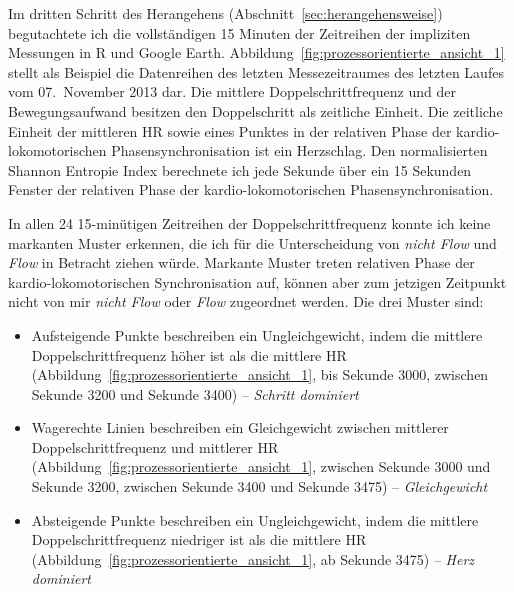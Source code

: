 \label{ssub:prozessorientierter_ansatz_5_1} 
\begin{sidewaysfigure}
	\resizebox{1.00 
	\textwidth}{!}{
	
	 }
	
	\caption[Beispielhafte Prozessdarstellung des letzten Laufabschnittes vom 07. November 2013 (Erste Studie: Laufen).]{Beispielhafte Prozessdarstellung des letzten Laufabschnittes vom 07. November 2013 \\
	\hspace{ 
	\textwidth} \emph{Anmerkung}: Rel. Phase = Relative Phase} \label{fig:prozessorientierte_ansicht_1} 
\end{sidewaysfigure}

Im dritten Schritt des Herangehens (Abschnitt~\ref{sec:herangehensweise}) begutachtete ich die vollständigen 15 Minuten der Zeitreihen der impliziten Messungen in R und Google Earth. Abbildung~\ref{fig:prozessorientierte_ansicht_1} stellt als Beispiel die Datenreihen des letzten Messezeitraumes des letzten Laufes vom 07.~November 2013 dar. Die mittlere Doppelschrittfrequenz und der Bewegungsaufwand besitzen den Doppelschritt als zeitliche Einheit. Die zeitliche Einheit der mittleren \ac{HR} sowie eines Punktes in der relativen Phase der kardio-lokomotorischen Phasensynchronisation ist ein Herzschlag. Den normalisierten Shannon Entropie Index berechnete ich jede Sekunde über ein 15 Sekunden Fenster der relativen Phase der kardio-lokomotorischen Phasensynchronisation. 

In allen 24 15-minütigen Zeitreihen der Doppelschrittfrequenz konnte ich keine markanten Muster erkennen, die ich für die Unterscheidung von \emph{nicht Flow} und \emph{Flow} in Betracht ziehen würde. Markante Muster treten relativen Phase der kardio-lokomotorischen Synchronisation auf, können aber zum jetzigen Zeitpunkt nicht von mir \emph{nicht Flow} oder \emph{Flow} zugeordnet werden. Die drei Muster sind: 
\begin{itemize}
	
	\item Aufsteigende Punkte beschreiben ein Ungleichgewicht, indem die mittlere Doppelschrittfrequenz höher ist als die mittlere \ac{HR} (Abbildung~\ref{fig:prozessorientierte_ansicht_1}, bis Sekunde 3000, zwischen Sekunde 3200 und Sekunde 3400) -- \emph{Schritt dominiert}
	
	\item Wagerechte Linien beschreiben ein Gleichgewicht zwischen mittlerer Doppelschrittfrequenz und mittlerer \ac{HR} (Abbildung~\ref{fig:prozessorientierte_ansicht_1}, zwischen Sekunde 3000 und Sekunde 3200, zwischen Sekunde 3400 und Sekunde 3475) -- \emph{Gleichgewicht}
	
	\item Absteigende Punkte beschreiben ein Ungleichgewicht, indem die mittlere Doppelschrittfrequenz niedriger ist als die mittlere \ac{HR} (Abbildung~\ref{fig:prozessorientierte_ansicht_1}, ab Sekunde 3475) -- \emph{Herz dominiert}
\end{itemize}

